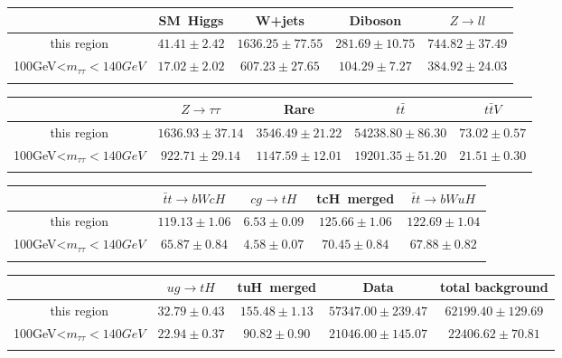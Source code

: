 \centering
\begin{tabular}{ccccc} \toprule\toprule
 & SM~Higgs & W+jets & Diboson & $Z\to ll$\\\midrule
this region & $41.41\pm2.42$ & $1636.25\pm77.55$ & $281.69\pm10.75$ & $744.82\pm37.49$\\
100GeV<$m_{\tau\tau}<140GeV$ & $17.02\pm2.02$ & $607.23\pm27.65$ & $104.29\pm7.27$ & $384.92\pm24.03$\\
\bottomrule\bottomrule\\
\end{tabular}
\begin{tabular}{ccccc} \toprule\toprule
 & $Z\to \tau\tau$ & Rare & $t\bar{t}$ & $t\bar{t}V$\\\midrule
this region & $1636.93\pm37.14$ & $3546.49\pm21.22$ & $54238.80\pm86.30$ & $73.02\pm0.57$\\
100GeV<$m_{\tau\tau}<140GeV$ & $922.71\pm29.14$ & $1147.59\pm12.01$ & $19201.35\pm51.20$ & $21.51\pm0.30$\\
\bottomrule\bottomrule\\
\end{tabular}
\begin{tabular}{ccccc} \toprule\toprule
 & $\bar{t}t\to bWcH$ & $cg\to tH$ & tcH~merged & $\bar{t}t\to bWuH$\\\midrule
this region & $119.13\pm1.06$ & $6.53\pm0.09$ & $125.66\pm1.06$ & $122.69\pm1.04$\\
100GeV<$m_{\tau\tau}<140GeV$ & $65.87\pm0.84$ & $4.58\pm0.07$ & $70.45\pm0.84$ & $67.88\pm0.82$\\
\bottomrule\bottomrule\\
\end{tabular}
\begin{tabular}{ccccc} \toprule\toprule
 & $ug\to tH$ & tuH~merged & Data & total background\\\midrule
this region & $32.79\pm0.43$ & $155.48\pm1.13$ & $57347.00\pm239.47$ & $62199.40\pm129.69$\\
100GeV<$m_{\tau\tau}<140GeV$ & $22.94\pm0.37$ & $90.82\pm0.90$ & $21046.00\pm145.07$ & $22406.62\pm70.81$\\
\bottomrule\bottomrule\\
\end{tabular}
